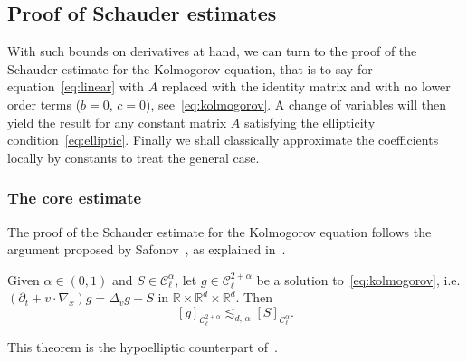 \documentclass[AHL,Unicode,longabstracts,published]{cedram}
\newcommand{\R}{\mathbb{R}}
\newcommand{\cC}{\mathcal{C}}
\begin{document}
\subsection{Proof of Schauder estimates}

With such bounds on derivatives at hand, we can turn to the proof of the Schauder estimate for the Kolmogorov equation, that is to say for equation~\eqref{eq:linear} with $A$ replaced with the identity matrix and with no lower order terms ($b=0$, $c=0$), see~\eqref{eq:kolmogorov}. A change of variables will then yield the result for any constant matrix $A$ satisfying the ellipticity condition~\eqref{eq:elliptic}. Finally we shall classically approximate the coefficients locally by constants to treat the general case.

\subsubsection{The core estimate}

The proof of the Schauder estimate for the Kolmogorov equation follows the argument proposed by Safonov~\cite{safonov1984}, as explained in~\cite{krylov1996}.
\begin{theo}\label{thm:constant}
Given $\alpha \in (0,1)$ and $S \in \cC_\ell^\alpha$, let $g \in \cC_\ell^{2+\alpha}$ be a solution to~\eqref{eq:kolmogorov}, i.e. $(\partial_t + v \cdot \nabla_x) g = \Delta_v g + S$ in $\R \times \R^d \times \R^d$. Then
\[
[g]_{\cC_\ell^{2+\alpha}} \lesssim_{d,\,\alpha} [S]_{\cC_\ell^\alpha}.
\]
\end{theo}

\begin{rema}
This theorem is the hypoelliptic counterpart of~\cite[Theorem~8.6.1~\& Lemma~8.7.1]{krylov1996}.
\end{rema}
\end{document}
